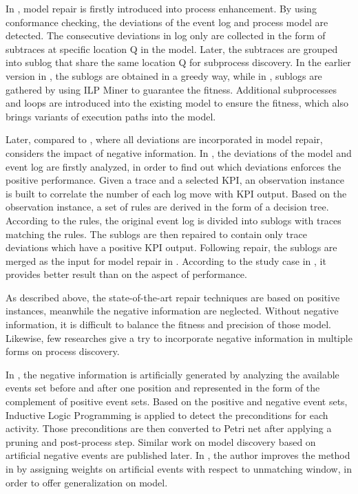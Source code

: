 In \cite{fahland2012repairing}, model repair is firstly introduced into process enhancement. By using conformance checking, the deviations of the event log and process model are detected. The consecutive deviations in log only are collected in the form of subtraces at specific location Q in the model. Later, the subtraces are grouped into sublog that share the same location Q for subprocess discovery. In the earlier version in \cite{fahland2012repairing}, the sublogs are obtained in a greedy way, while in \cite{fahland2015model}, sublogs are gathered by using ILP Miner to guarantee the fitness. Additional subprocesses and loops are introduced into the existing model to ensure the fitness, which also brings variants of execution paths into the model. 

Later, compared to \cite{fahland2012repairing, fahland2015model}, where all deviations are incorporated in model repair, \cite{dees2017enhancing} considers the impact of negative information.  In \cite{dees2017enhancing}, the deviations of the model and event log are firstly analyzed, in order to find out which deviations enforces the positive performance. Given a trace and a selected KPI, an observation instance is built to correlate the number of each log move with KPI output. Based on the observation instance,  a set of rules are derived in the form of a decision tree. According to the rules, the original event log is divided into sublogs with traces matching the rules. The sublogs are then repaired to contain only trace deviations which have a positive KPI output. Following repair, the sublogs are merged as the input for model repair in \cite{fahland2015model}. According to the study case in \cite{dees2017enhancing}, it provides better result than \cite{fahland2015model} on the aspect of performance. 
 
As described above, the state-of-the-art repair techniques are based on positive instances, meanwhile the negative information are neglected. Without negative information, it is difficult to balance the fitness and precision of those model. Likewise, few researches give a try to incorporate negative information in multiple forms on process discovery.

In \cite{goedertier2009robust}, the negative information is artificially generated by analyzing the available events set before and after one position and represented in the form of the complement of positive event sets. Based on the positive and negative event sets, Inductive Logic Programming is applied to detect the preconditions for each activity. Those preconditions are then converted to Petri net after applying a pruning and post-process step. Similar work on model discovery based on artificial negative events are published later. In \cite{vanden2014determining}, the author improves the method in \cite{goedertier2009robust} by assigning weights on artificial events with respect to unmatching window, in order to offer generalization on model. 

